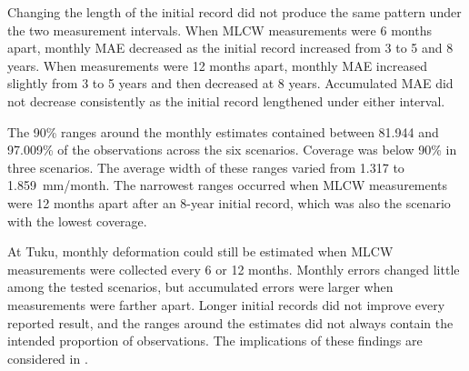 Changing the length of the initial record did not produce the same pattern under the two measurement intervals. When MLCW measurements were 6 months apart, monthly MAE decreased as the initial record increased from 3 to 5 and 8 years. When measurements were 12 months apart, monthly MAE increased slightly from 3 to 5 years and then decreased at 8 years. Accumulated MAE did not decrease consistently as the initial record lengthened under either interval.

The 90\% ranges around the monthly estimates contained between 81.944 and 97.009\% of the observations across the six scenarios. Coverage was below 90\% in three scenarios. The average width of these ranges varied from 1.317 to 1.859~mm/month. The narrowest ranges occurred when MLCW measurements were 12 months apart after an 8-year initial record, which was also the scenario with the lowest coverage.

At Tuku, monthly deformation could still be estimated when MLCW measurements were collected every 6 or 12 months. Monthly errors changed little among the tested scenarios, but accumulated errors were larger when measurements were farther apart. Longer initial records did not improve every reported result, and the ranges around the estimates did not always contain the intended proportion of observations. The implications of these findings are considered in .

\FloatBarrier
